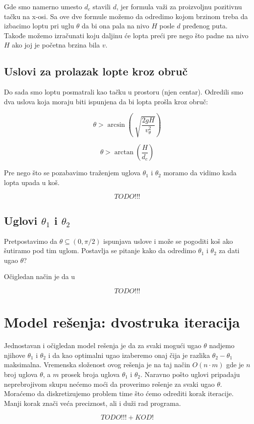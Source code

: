 \documentclass[a4paper, 12pt]{article}
\begin{document}
Gde smo namerno umesto $d_c$ stavili $d$, jer formula važi za proizvoljnu pozitivnu tačku na x-osi. Sa ove dve formule možemo da odredimo kojom brzinom treba da izbacimo loptu pri uglu $\theta$ da bi ona pala na nivo $H$ posle $d$ pređenog puta. Takođe možemo izračunati koju daljinu će lopta preći pre nego što padne na nivo $H$ ako joj je početna brzina bila $v$.

\pagebreak

\subsection{Uslovi za prolazak lopte kroz obruč} %

Do sada smo loptu posmatrali kao tačku u prostoru (njen centar). Odredili smo dva uslova koja moraju biti ispunjena da bi lopta prošla kroz obruč:

\[{\theta} > \arcsin(\sqrt[]{\dfrac{2 g H}{v_{\theta}^2}}) \]

\[{\theta} > \arctan(\dfrac{H}{d_c}) \]

Pre nego što se pozabavimo traženjem uglova $\theta_1$ i $\theta_2$ moramo da vidimo kada lopta upada u koš.

\[TODO!!!\]

\subsection{Uglovi $\theta_1$ i $\theta_2$} %

Pretpostavimo da $\theta \subseteq (0,\pi/2)$ ispunjava uslove i može se pogoditi koš ako šutiramo pod tim uglom. Postavlja se pitanje kako da odredimo $\theta_1$ i $\theta_2$ za dati ugao $\theta$?

Očigledan način je da u

\[TODO!!!\]



\section{Model rešenja: dvostruka iteracija} %

Jednostavan i očigledan model rešenja je da za svaki mogući ugao $\theta$ nadjemo njihove $\theta_1$ i $\theta_2$ i da kao optimalni ugao izaberemo onaj čija je razlika
$\theta_2 - \theta_1$ maksimalna. Vremenska složenost ovog rešenja je na taj način $O(n \cdot m)$ gde je $n$ broj uglova $\theta$, a $m$ prosek broja uglova $\theta_1$ i $\theta_2$. Naravno pošto uglovi pripadaju neprebrojivom skupu nećemo moći da proverimo rešenje za svaki ugao $\theta$. Moraćemo da diskretizujemo problem time što ćemo odrediti korak iteracije. Manji korak znači veća preciznost, ali i duži rad programa.

\[TODO!!! + KOD!\]
\end{document}
